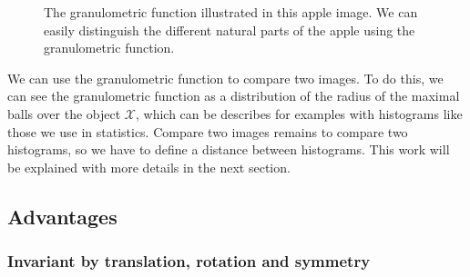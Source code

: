 \begin{figure}[!ht]
    \centering
    \qquad\qquad\qquad
    \caption{The granulometric function illustrated in this apple image. We can easily distinguish the different natural parts of the apple using the granulometric function.}
    \label{apple-granulo}
\end{figure}

We can use the granulometric function to compare two images. To do this, we can see the granulometric function as a distribution of the radius of the maximal balls over the object $\mathcal{X}$, which can be describes for examples with histograms like those we use in statistics. Compare two images remains to compare two histograms, so we have to define a distance between histograms. This work will be explained with more details in the next section.

\subsection{Advantages}

\subsubsection{Invariant by translation, rotation and symmetry}

